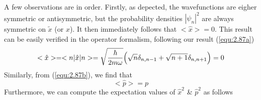 A few observations are in order. Firstly, as depected, the
wavefunctions are eigher symmetric or antisymmetric, but the
probability densities $|\psi_n|^2$ are always symmetric on
$\tilde{x}$ (or $x$). It then immediately follows that
$<\hat{x}> = 0$. This result can be easily verified in the
operator formalism, following our result (\ref{equ:2.87a})
\begin{equation}
  <\hat{x}> = <n|\hat{x}|n> = \sqrt{\frac{\hbar}{2m\omega}}
  \Bigl(
  \sqrt{n}\delta_{n, n-1} + \sqrt{n+1}\delta_{n, n+1}
  \Bigr)
  = 0
  \label{equ:2.99}
\end{equation}
Similarly, from (\ref{equ:2.87b}), we find that
\begin{equation}
  <\hat{p}> = p
  \label{equ:2.100}
\end{equation}
Furthermore, we can compute the expectation values of
$\hat{x}^2$ \& $\hat{p}^2$ as follows

